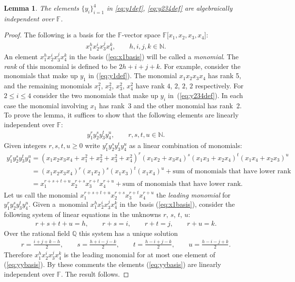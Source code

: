 \documentclass[pdftex]{sigma}
\numberwithin{equation}{section}
\newtheorem{Lemma}[Theorem]{Lemma}
\begin{document}
\begin{Lemma}
\label{lem:fiveindep}
The elements
 $\lbrace y_i\rbrace_{i=1}^4$ in
\eqref{eq:y1def},
\eqref{eq:y234def}
 are algebraically
independent over $\mathbb F$.
\end{Lemma}
\begin{proof}
The following is a basis for
the $\mathbb F$-vector space
$\mathbb F\lbrack x_1, x_2, x_3, x_4\rbrack$:
\begin{gather}
x_1^hx_2^ix_3^jx_4^k, \qquad h,i,j,k\in \mathbb N.
\label{eq:x1basis}
\end{gather}
An element
$x_1^hx_2^ix_3^jx_4^k$
in
the basis
(\ref{eq:x1basis}) will be called a {\it monomial}.
The {\it rank} of this monomial is def\/ined
to be $2h+i+j+k$.
For example,
consider the monomials that make up
$y_1$ in
(\ref{eq:y1def}).
The monomial
$x_1x_2x_3x_4$ has rank 5, and
the remaining monomials
$x_1^2$, $x_2^2$, $x_3^2$, $x_4^2$ have rank
$4$, $2$, $2$, $2$ respectively.
For $2 \leq i \leq 4$
consider the two monomials that make up $y_i$ in~(\ref{eq:y234def}). In each case
the monomial involving $x_1$ has
rank~3 and the other monomial
has rank~2.
To prove the lemma,
it suf\/f\/ices to show that the following elements
are linearly independent over $\mathbb F$:
\begin{gather}
y_1^ry_2^sy_3^ty_4^u, \qquad r,s,t,u\in \mathbb N.
\label{eq:yybasis}
\end{gather}
Given integers $r,s,t,u\geq 0$
 write
$y_1^ry_2^sy_3^ty_4^u$
as a linear combination of monomials:
\begin{gather*}
y_1^ry_2^sy_3^ty_4^u
=
(x_1x_2x_3x_4
+x_1^2+x_2^2+x_3^2+x_4^2)^r
(x_1x_2+x_3x_4)^s
(x_1x_3+x_2x_4)^t
(x_1x_4+x_2x_3)^u
\\
\phantom{y_1^ry_2^sy_3^ty_4^u}{} =
(x_1x_2x_3x_4)^r
(x_1x_2)^s
(x_1x_3)^t
(x_1x_4)^u
 + {\mbox{sum of monomials that have lower rank}}
\\
\phantom{y_1^ry_2^sy_3^ty_4^u}{} =
x_1^{r+s+t+u}
x_2^{r+s}
x_3^{r+t}
x_4^{r+u}
  +  {\mbox{sum of monomials that have lower rank}}.
\end{gather*}
Let us call
the monomial
$x_1^{r+s+t+u}
x_2^{r+s}
x_3^{r+t}
x_4^{r+u} $ the {\it leading monomial} for
$y_1^ry_2^sy_3^ty_4^u$. Given a~monomial $x_1^hx_2^ix_3^jx_4^k$ in the basis
(\ref{eq:x1basis}), consider the following
system of
linear equations in the unknowns $r$, $s$, $t$, $u$:
\begin{gather*}
r+s+t+u=h,
\qquad r+s=i,
\qquad r+t=j,
\qquad r+u=k.
\end{gather*}
Over the rational f\/ield $\mathbb Q$ this system has a unique
solution
\begin{gather*}
 r = \frac{i+j+k-h}{2},
\qquad
s = \frac{h+i-j-k}{2},
\qquad
 t = \frac{h-i+j-k}{2},
  \qquad
u = \frac{h-i-j+k}{2}.
\end{gather*}
Therefore
 $x_1^hx_2^ix_3^jx_4^k$
is the leading monomial
for at most one element
of (\ref{eq:yybasis}).
By these comments the elements
(\ref{eq:yybasis}) are linearly independent over $\mathbb F$.
The result follows.
\end{proof}
\end{document}
